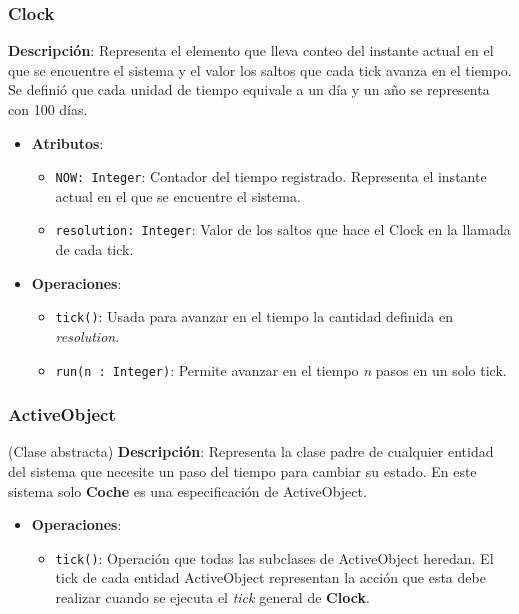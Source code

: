 \documentclass[12pt.a4paper]{article}
\begin{document}
\subsubsection{Clock}
\textbf{Descripción}:  
Representa el elemento que lleva conteo del instante actual en el que se encuentre el sistema y el valor los saltos que cada tick avanza en el tiempo. Se definió que cada unidad de tiempo equivale a un día y un año se representa con 100 días.
\begin{itemize}
    \item \textbf{Atributos}:
    \begin{itemize}
        \item \texttt{NOW: Integer}: Contador del tiempo registrado. Representa el instante actual en el que se encuentre el sistema.
        \item \texttt{resolution: Integer}: Valor de los saltos que hace el Clock en la llamada de cada tick.
    \end{itemize}
    \item \textbf{Operaciones}:
    \begin{itemize}
        \item \texttt{tick()}: Usada para avanzar en el tiempo la cantidad definida en \emph{resolution}.
        \item \texttt{run(n : Integer)}: Permite avanzar en el tiempo \emph{n} pasos en un solo tick.
    \end{itemize}
\end{itemize}

\subsubsection{ActiveObject} (Clase abstracta)
\textbf{Descripción}:  
Representa la clase padre de cualquier entidad del sistema que necesite un paso del tiempo para cambiar su estado. En este sistema solo \textbf{Coche} es una especificación de ActiveObject.
\begin{itemize}
    \item \textbf{Operaciones}:
    \begin{itemize}
        \item \texttt{tick()}: Operación que todas las subclases de ActiveObject heredan. El tick de cada entidad ActiveObject representan la acción que esta debe realizar cuando se ejecuta el \emph{tick} general de \textbf{Clock}.
    \end{itemize}
\end{itemize}
\end{document}

